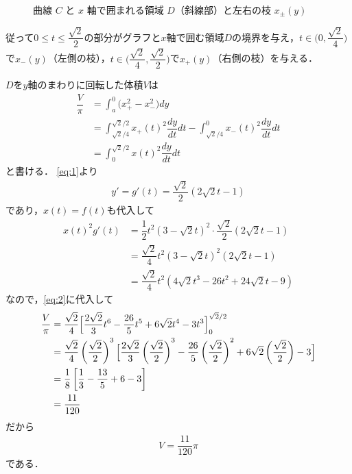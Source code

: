 \documentclass[../../main.tex]{subfiles}
\begin{document}
\begin{figure}[htb]
\begin{center}
  \end{center}
  \caption{曲線 $C$ と $x$ 軸で囲まれる領域 $D$（斜線部）と左右の枝 $x_\pm(y)$}
\end{figure}

従って$0\le t\le\dfrac{\sqrt{2}}{2}$の部分がグラフと$x$軸で囲む領域$D$の境界を与え，$t\in\bigl(0,\dfrac{\sqrt{2}}{4}\bigr)$で$x_-(y)$（左側の枝），$t\in\bigl(\dfrac{\sqrt{2}}{4},\dfrac{\sqrt{2}}{2}\bigr)$で$x_+(y)$（右側の枝）を与える．

$D$を$y$軸のまわりに回転した体積$V$は
\begin{align}
  \dfrac{V}{\pi}
  &=\int_a^0\bigl(x_+^2-x_-^2\bigr)dy \\
  &=\int_{\sqrt{2}/4}^{\sqrt{2}/2}x_{+}(t)^2\dfrac{dy}{dt}dt - \int_{\sqrt{2}/4}^{0}x_{-}(t)^2\dfrac{dy}{dt}dt \\
  &=\int_{0}^{\sqrt{2}/2}x(t)^2\dfrac{dy}{dt}dt \label{eq:2}
\end{align}
と書ける．
\cref{eq:1}より
\begin{align}
  y'=g'(t)=\dfrac{\sqrt{2}}{2}(2\sqrt{2}t-1)
\end{align}
であり，$x(t)=f(t)$も代入して
\begin{align}
  x(t)^2g'(t)
  &=\dfrac{1}{2}t^2(3-\sqrt{2}t)^2\cdot\dfrac{\sqrt{2}}{2}(2\sqrt{2}t-1) \\
  &=\dfrac{\sqrt{2}}{4}t^2(3-\sqrt{2}t)^2(2\sqrt{2}t-1)\\
  &=\dfrac{\sqrt{2}}{4}t^2(4\sqrt{2}t^3-26t^2+24\sqrt{2}t-9)
\end{align}
なので，\cref{eq:2}に代入して
\begin{align}
  \dfrac{V}{\pi}
  &=\dfrac{\sqrt{2}}{4}\Bigl[\dfrac{2\sqrt{2}}{3}t^6-\dfrac{26}{5}t^5+6\sqrt{2}t^4-3t^3\Bigr]_0^{\sqrt{2}/2} \\
  &=\dfrac{\sqrt{2}}{4}\left(\dfrac{\sqrt{2}}{2}\right)^{3}\Bigl[\dfrac{2\sqrt{2}}{3}\left(\dfrac{\sqrt{2}}{2}\right)^3-\dfrac{26}{5}\left(\dfrac{\sqrt{2}}{2}\right)^2+6\sqrt{2}\left(\dfrac{\sqrt{2}}{2}\right) -3 \Bigr] \\
  &=\dfrac{1}{8}\left[\dfrac{1}{3}-\dfrac{13}{5}+6-3\right] \\
  &=\dfrac{11}{120}
\end{align}
だから
\begin{align}
  V=\dfrac{11}{120}\pi
\end{align}
である．

\newpage
\end{document}
